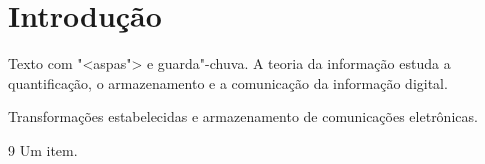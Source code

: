 \documentclass{report}
\begin{document}
\tableofcontents
\chapter{Introdução}
Texto com "<aspas"> e guarda"-chuva. A teoria da informação estuda a quantificação, o armazenamento e a
comunicação da informação digital.
\begin{minipage}{60pt}
Transformações estabelecidas e armazenamento de comunicações eletrônicas.
\end{minipage}
\begin{thebibliography}{9}
 Um item.
\end{thebibliography}
\end{document}
